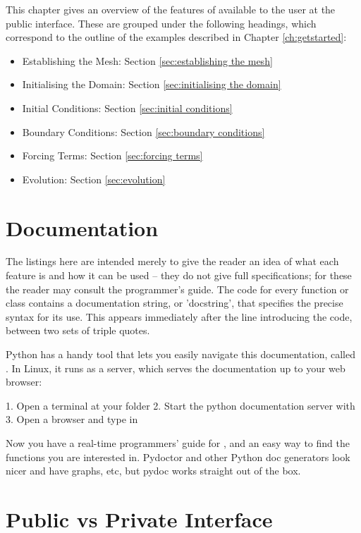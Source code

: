 \documentclass{manual}
\begin{document}
This chapter gives an overview of the features of \anuga available
to the user at the public interface. These are grouped under the
following headings, which correspond to the outline of the examples
described in Chapter \ref{ch:getstarted}:
\begin{itemize}
    \item Establishing the Mesh: Section \ref{sec:establishing the mesh}
    \item Initialising the Domain: Section \ref{sec:initialising the domain}
    \item Initial Conditions: Section \ref{sec:initial conditions}
    \item Boundary Conditions: Section \ref{sec:boundary conditions}
    \item Forcing Terms: Section \ref{sec:forcing terms}
    \item Evolution: Section \ref{sec:evolution}
\end{itemize}

\section{Documentation}

The listings here are intended merely to give the reader an idea of what
each feature is and how it can be used -- they do
not give full specifications; for these the reader
may consult the programmer's guide. The code for every function or class contains
a documentation string, or 'docstring', that specifies the precise
syntax for its use. This appears immediately after the line
introducing the code, between two sets of triple quotes.

Python has a handy tool that lets you easily navigate this documentation,
called . In Linux, it runs as a server, which serves the
documentation up to your web browser:

1. Open a terminal at your  folder
2. Start the python documentation server with 
3. Open a browser and type in 

Now you have a real-time programmers' guide for \anuga, and an easy way to find 
the functions you are interested in. Pydoctor and other Python doc generators
look nicer and have graphs, etc, but pydoc works straight out of the box. 

\section{Public vs Private Interface}
\end{document}
